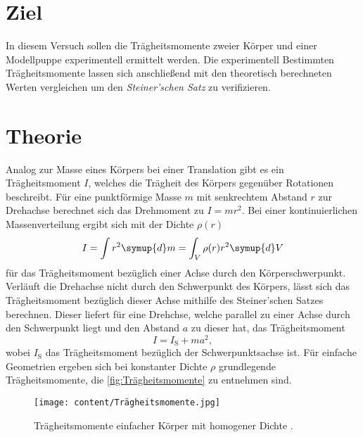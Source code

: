 \section{Ziel}
\label{sec:Ziel}
In diesem Versuch sollen die Trägheitsmomente zweier Körper und einer Modellpuppe experimentell ermittelt werden. Die experimentell Bestimmten Trägheitsmomente lassen sich
anschließend mit den theoretisch berechneten Werten vergleichen um den \textit{Steiner'schen Satz} zu verifizieren. 

\section{Theorie}
\label{sec:Theorie}
Analog zur Masse eines Körpers bei einer Translation gibt es ein Trägheitsmoment $I$, welches die Trägheit des Körpers gegenüber Rotationen beschreibt. Für eine punktförmige
Masse $m$ mit senkrechtem Abstand $r$ zur Drehachse berechnet sich das Drehmoment zu $I = mr^2$. Bei einer kontinuierlichen Massenverteilung ergibt sich mit der 
Dichte $\rho(r)$
\begin{equation}
    \label{eqn:Trägheitsmoment}
    I = \int r^2 \symup{d}m = \int_V \rho(r) r^2 \symup{d}V
\end{equation}
für das Trägheitsmoment bezüglich einer Achse durch den Körperschwerpunkt. Verläuft die Drehachse nicht durch den Schwerpunkt des Körpers, lässt sich das Trägheitsmoment 
bezüglich dieser Achse mithilfe des Steiner'schen Satzes berechnen. Dieser liefert für eine Drehchse, welche parallel zu einer Achse durch den Schwerpunkt liegt und den Abstand
$a$ zu dieser hat, das Trägheitsmoment 
\begin{equation}
    \label{eqn:Steiner}
    I = I_\text{S} + ma^2,
\end{equation}    
wobei $I_\text{S}$ das Trägheitsmoment bezüglich der Schwerpunktsachse ist.
Für einfache Geometrien ergeben sich bei konstanter Dichte $\rho$ grundlegende Trägheitsmomente, die \autoref{fig:Trägheitsmomente} zu entnehmen sind.
\begin{figure}
    \centering
    \caption{Trägheitsmomente einfacher Körper mit homogener Dichte \cite{v101}.}
    \label{fig:Trägheitsmomente}
    \texttt{[image: content/Trägheitsmomente.jpg]}
\end{figure}

